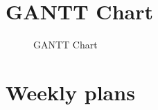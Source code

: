 \section{GANTT Chart}
\label{sec:GANTT Chart}
\label{fig:GANTT Chart}
\begin{figure}[H]
	\centering
	\caption{GANTT Chart}
\end{figure}
\newpage

\section{Weekly plans}
\label{sec:Project Planning}

